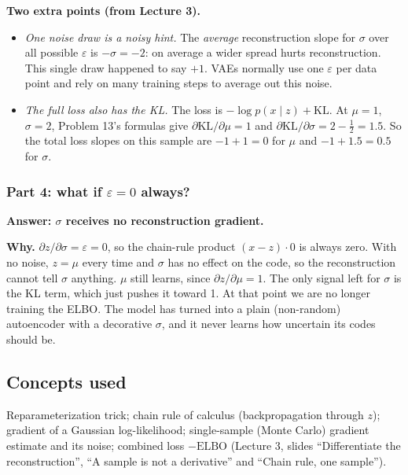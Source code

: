 \documentclass[12pt,a4paper]{article}
\begin{document}
\textbf{Two extra points (from Lecture 3).}
\begin{itemize}[leftmargin=*]
\item \emph{One noise draw is a noisy hint.} The \emph{average} reconstruction slope for $\sigma$ over all possible $\varepsilon$ is $-\sigma = -2$: on average a wider spread hurts reconstruction. This single draw happened to say $+1$. VAEs normally use one $\varepsilon$ per data point and rely on many training steps to average out this noise.
\item \emph{The full loss also has the KL.} The loss is $-\log p(x\mid z) + \mathrm{KL}$. At $\mu = 1$, $\sigma = 2$, Problem 13's formulas give $\partial\mathrm{KL}/\partial\mu = 1$ and $\partial\mathrm{KL}/\partial\sigma = 2 - \tfrac{1}{2} = 1.5$. So the total loss slopes on this sample are $-1 + 1 = 0$ for $\mu$ and $-1 + 1.5 = 0.5$ for $\sigma$.
\end{itemize}

\subsubsection{Part 4: what if $\varepsilon = 0$ always?}

\textbf{Answer: $\sigma$ receives no reconstruction gradient.}

\textbf{Why.} $\partial z/\partial\sigma = \varepsilon = 0$, so the chain-rule product $(x - z)\cdot 0$ is always zero. With no noise, $z = \mu$ every time and $\sigma$ has no effect on the code, so the reconstruction cannot tell $\sigma$ anything. $\mu$ still learns, since $\partial z/\partial\mu = 1$. The only signal left for $\sigma$ is the KL term, which just pushes it toward 1. At that point we are no longer training the ELBO. The model has turned into a plain (non-random) autoencoder with a decorative $\sigma$, and it never learns how uncertain its codes should be.

\subsection{Concepts used}

Reparameterization trick; chain rule of calculus (backpropagation through $z$); gradient of a Gaussian log-likelihood; single-sample (Monte Carlo) gradient estimate and its noise; combined loss $-\text{ELBO}$ (Lecture 3, slides ``Differentiate the reconstruction'', ``A sample is not a derivative'' and ``Chain rule, one sample'').

\end{document}
